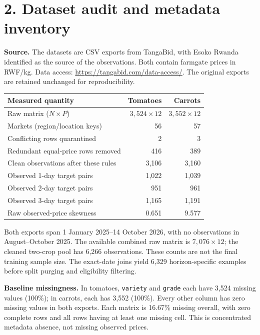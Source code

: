 \documentclass[11pt,a4paper]{article}
\begin{document}
\section*{2. Dataset audit and metadata inventory}
\textbf{Source.} The datasets are CSV exports from TangaBid, with Esoko Rwanda identified as the source of the observations. Both contain farmgate prices in RWF/kg. Data access: \url{https://tangabid.com/data-access/}. The original exports are retained unchanged for reproducibility.

\begin{tabularx}{\textwidth}{@{}Lrr@{}}\toprule
Measured quantity & Tomatoes & Carrots\\\midrule
Raw matrix ($N\times P$) & $3,524\times12$ & $3,552\times12$\\
Markets (region/location keys) & 56 & 57\\
Conflicting rows quarantined & 2 & 3\\
Redundant equal-price rows removed & 416 & 389\\
Clean observations after these rules & 3,106 & 3,160\\
Observed 1-day target pairs & 1,022 & 1,039\\
Observed 2-day target pairs & 951 & 961\\
Observed 3-day target pairs & 1,165 & 1,191\\
Raw observed-price skewness & 0.651 & 9.577\\\bottomrule
\end{tabularx}

Both exports span 1 January 2025--14 October 2026, with no observations in August--October 2025. The available combined raw matrix is $7,076\times12$; the cleaned two-crop pool has 6,266 observations. These counts are not the final training sample size. The exact-date joins yield 6,329 horizon-specific examples before split purging and eligibility filtering.

\textbf{Baseline missingness.} In tomatoes, \texttt{variety} and \texttt{grade} each have 3,524 missing values (100\%); in carrots, each has 3,552 (100\%). Every other column has zero missing values in both exports. Each matrix is 16.67\% missing overall, with zero complete rows and all rows having at least one missing cell. This is concentrated metadata absence, not missing observed prices.
\end{document}
